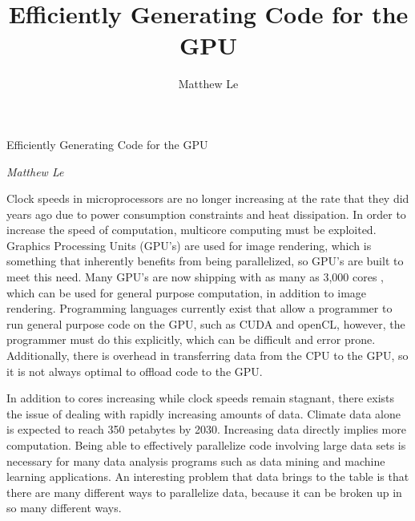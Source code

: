 \documentclass[a4paper,12pt]{article}
\title{Efficiently Generating Code for the GPU }
\author{Matthew Le \small}
\newcommand{\tab}{\hspace*{2em}}
\begin{document}
\setlength{\droptitle}{-30pt}
\begin{center}
{\Large Efficiently Generating Code for the GPU}

\emph{Matthew Le}
\end{center}
\tab Clock speeds in microprocessors are no longer increasing at the rate that they did years ago due to power consumption constraints and heat dissipation.  In order to increase the speed of computation, multicore computing must be exploited. Graphics Processing Units (GPU's) are used for image rendering, which is something that inherently benefits from being parallelized, so GPU's are built to meet this need.  Many GPU's are now shipping with as many as 3,000 cores \cite{nvideaGPU}, which can be used for general purpose computation, in addition to image rendering.  Programming languages currently exist that allow a programmer to run general purpose code on the GPU, such as CUDA and openCL, however, the programmer must do this explicitly, which can be difficult and error prone.  Additionally, there is overhead in transferring data from the CPU to the GPU, so it is not always optimal to offload code to the GPU.

In addition to cores increasing while clock speeds remain stagnant, there exists the issue of dealing with rapidly increasing amounts of data.  Climate data alone is expected to reach 350 petabytes by 2030\cite{climateData}.  Increasing data directly implies more computation.  Being able to effectively parallelize code involving large data sets is necessary for many data analysis programs such as data mining and machine learning applications.  An interesting problem that data brings to the table is that there are many different ways to parallelize data, because it can be broken up in so many different ways.
\end{document}

